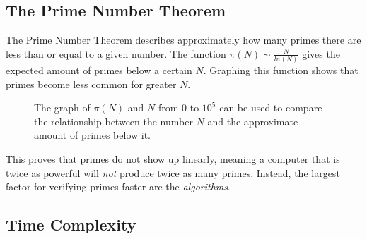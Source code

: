 \documentclass[main.tex]{subfiles}
\begin{document}
\subsection{The Prime Number Theorem}
The Prime Number Theorem \cite{theorem:prime_num} describes approximately how
many primes there are less than or equal to a given number. The function $\pi(N)
\sim \frac{N}{ln(N)}$ gives the expected amount of primes below a certain $N$.
Graphing this function shows that primes become less common for greater $N$.

\begin{figure}[ht]
  \begin{center}
  \end{center}
  \caption{The graph of $\pi(N)$ and $N$ from $0$ to $10^{5}$ can be used to
    compare the relationship between the number $N$ and the approximate amount
    of primes below it.}
\end{figure}

This proves that primes do not show up linearly, meaning a computer that is
twice as powerful will \textit{not} produce twice as many primes. Instead, the
largest factor for verifying primes faster are the \textit{algorithms}.

\subsection{Time Complexity}
\end{document}

